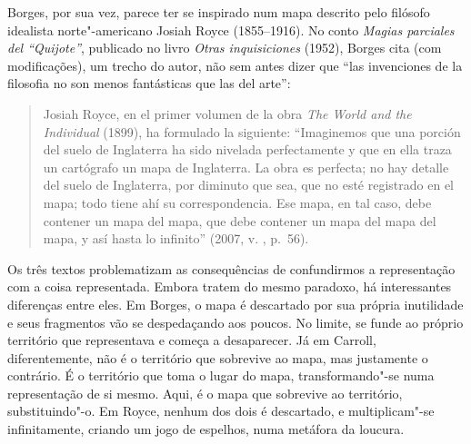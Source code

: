 Borges, por sua vez, parece ter se inspirado num mapa descrito pelo
filósofo idealista norte"-americano Josiah Royce (1855--1916). No conto
\emph{Magias parciales del ``Quijote''}, publicado no livro \emph{Otras
inquisiciones} (1952), Borges cita (com modificações), um trecho do
autor, não sem antes dizer que ``las invenciones de la filosofia no son
menos fantásticas que las del arte'':

\begin{quote}
Josiah Royce, en el primer volumen de la obra \emph{The World and the
Individual} (1899), ha formulado la siguiente: ``Imaginemos que una
porción del suelo de Inglaterra ha sido nivelada perfectamente y que en
ella traza un cartógrafo un mapa de Inglaterra. La obra es perfecta; no
hay detalle del suelo de Inglaterra, por diminuto que sea, que no esté
registrado en el mapa; todo tiene ahí su correspondencia. Ese mapa, en
tal caso, debe contener un mapa del mapa, que debe contener un mapa del
mapa del mapa, y así hasta lo infinito'' (2007, v. , p.~56).
\end{quote}

Os três textos problematizam as consequências de confundirmos a
representação com a coisa representada. Embora tratem do mesmo paradoxo,
há interessantes diferenças entre eles. Em Borges, o mapa é descartado
por sua própria inutilidade e seus fragmentos vão se despedaçando aos
poucos. No limite, se funde ao próprio território que representava e
começa a desaparecer. Já em Carroll, diferentemente, não é o território
que sobrevive ao mapa, mas justamente o contrário. É o território que
toma o lugar do mapa, transformando"-se numa representação de si
mesmo. Aqui, é o mapa que sobrevive ao território, substituindo"-o. Em
Royce, nenhum dos dois é descartado, e multiplicam"-se infinitamente,
criando um jogo de espelhos, numa metáfora da loucura.

